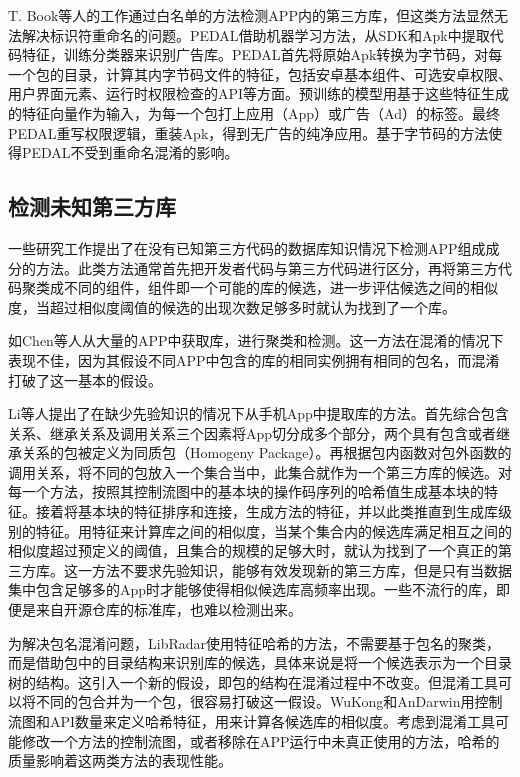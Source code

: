 T. Book等人的工作通过白名单的方法检测APP内的第三方库\cite{book2013longitudinal}，但这类方法显然无法解决标识符重命名的问题。PEDAL\cite{liu2015efficient}借助机器学习方法，从SDK和Apk中提取代码特征，训练分类器来识别广告库。PEDAL首先将原始Apk转换为字节码，对每一个包的目录，计算其内字节码文件的特征，包括安卓基本组件、可选安卓权限、用户界面元素、运行时权限检查的API等方面。预训练的模型用基于这些特征生成的特征向量作为输入，为每一个包打上应用（App）或广告（Ad）的标签。最终PEDAL重写权限逻辑，重装Apk，得到无广告的纯净应用。基于字节码的方法使得PEDAL不受到重命名混淆的影响。


\subsection{检测未知第三方库}

一些研究工作提出了在没有已知第三方代码的数据库知识情况下检测APP组成成分的方法。此类方法通常首先把开发者代码与第三方代码进行区分，再将第三方代码聚类成不同的组件，组件即一个可能的库的候选，进一步评估候选之间的相似度，当超过相似度阈值的候选的出现次数足够多时就认为找到了一个库。

如Chen等人\cite{chen2016following}从大量的APP中获取库，进行聚类和检测。这一方法在混淆的情况下表现不佳，因为其假设不同APP中包含的库的相同实例拥有相同的包名，而混淆打破了这一基本的假设。

Li等人\cite{li2018large}提出了在缺少先验知识的情况下从手机App中提取库的方法。首先综合包含关系、继承关系及调用关系三个因素将App切分成多个部分，两个具有包含或者继承关系的包被定义为{\kaishu 同质包}（Homogeny Package）。再根据包内函数对包外函数的调用关系，将不同的包放入一个集合当中，此集合就作为一个第三方库的候选。对每一个方法，按照其控制流图中的基本块的操作码序列的哈希值生成基本块的特征。接着将基本块的特征排序和连接，生成方法的特征，并以此类推直到生成库级别的特征。用特征来计算库之间的相似度，当某个集合内的候选库满足相互之间的相似度超过预定义的阈值，且集合的规模的足够大时，就认为找到了一个真正的第三方库。这一方法不要求先验知识，能够有效发现新的第三方库，但是只有当数据集中包含足够多的App时才能够使得相似候选库高频率出现。一些不流行的库，即便是来自开源仓库的标准库，也难以检测出来。



为解决包名混淆问题，LibRadar\cite{ma2016libradar}使用特征哈希的方法，不需要基于包名的聚类，而是借助包中的目录结构来识别库的候选，具体来说是将一个候选表示为一个目录树的结构。这引入一个新的假设，即包的结构在混淆过程中不改变。但混淆工具可以将不同的包合并为一个包，很容易打破这一假设。WuKong\cite{wang2015wukong}和AnDarwin\cite{crussell2014andarwin}用控制流图和API数量来定义哈希特征，用来计算各候选库的相似度。考虑到混淆工具可能修改一个方法的控制流图，或者移除在APP运行中未真正使用的方法，哈希的质量影响着这两类方法的表现性能。


